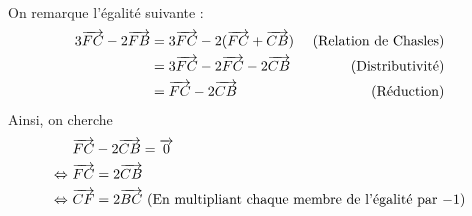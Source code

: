 \documentclass{controle}
\begin{document}
\begin{questions}
\begin{solution}
On remarque l'égalité suivante :
\begin{equation*}
\begin{aligned}
3\overrightarrow{FC} - 2\overrightarrow{FB} &= 3\overrightarrow{FC} - 2(\overrightarrow{FC} + \overrightarrow{CB})&\text{~(Relation de Chasles)}\\
&= 3\overrightarrow{FC} -2\overrightarrow{FC} -2\overrightarrow{CB} &\text{~(Distributivité)}\\
&= \overrightarrow{FC} -2\overrightarrow{CB} &\text{~(Réduction)}
\end{aligned}
\end{equation*}
Ainsi, on cherche
\begin{equation*}
\begin{aligned}
&~\overrightarrow{FC} - 2\overrightarrow{CB} = \overrightarrow{0}\\
\Leftrightarrow& ~\overrightarrow{FC} = 2\overrightarrow{CB}\\
\Leftrightarrow& ~\overrightarrow{CF} = 2\overrightarrow{BC}\text{~(En multipliant chaque membre de l'égalité par $-1$)}
\end{aligned}
\end{equation*}
\end{solution}
\end{questions}
\newpage
\setcounter{page}{1}
\titleandname{}
\version
\end{document}
